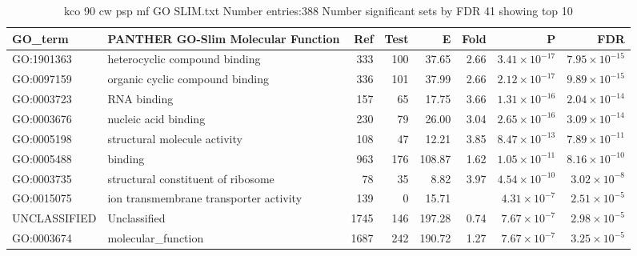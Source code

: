\begin{table}[ht]
\centering
\begin{tabular}{llrrrrrr}
  \hline
GO\_term & PANTHER GO-Slim Molecular Function & Ref & Test & E & Fold & P & FDR \\ 
  \hline
GO:1901363 & heterocyclic compound binding  & 333 & 100 & 37.65 & 2.66 & $3.41 \times 10^{-17}$ & $7.95 \times 10^{-15}$ \\ 
  GO:0097159 & organic cyclic compound binding  & 336 & 101 & 37.99 & 2.66 & $2.12 \times 10^{-17}$ & $9.89 \times 10^{-15}$ \\ 
  GO:0003723 & RNA binding  & 157 & 65 & 17.75 & 3.66 & $1.31 \times 10^{-16}$ & $2.04 \times 10^{-14}$ \\ 
  GO:0003676 & nucleic acid binding  & 230 & 79 & 26.00 & 3.04 & $2.65 \times 10^{-16}$ & $3.09 \times 10^{-14}$ \\ 
  GO:0005198 & structural molecule activity  & 108 & 47 & 12.21 & 3.85 & $8.47 \times 10^{-13}$ & $7.89 \times 10^{-11}$ \\ 
  GO:0005488 & binding  & 963 & 176 & 108.87 & 1.62 & $1.05 \times 10^{-11}$ & $8.16 \times 10^{-10}$ \\ 
  GO:0003735 & structural constituent of ribosome  & 78 & 35 & 8.82 & 3.97 & $4.54 \times 10^{-10}$ & $3.02 \times 10^{-8}$ \\ 
  GO:0015075 & ion transmembrane transporter activity  & 139 & 0 & 15.71 &  & $4.31 \times 10^{-7}$ & $2.51 \times 10^{-5}$ \\ 
  UNCLASSIFIED & Unclassified  & 1745 & 146 & 197.28 & 0.74 & $7.67 \times 10^{-7}$ & $2.98 \times 10^{-5}$ \\ 
  GO:0003674 & molecular\_function  & 1687 & 242 & 190.72 & 1.27 & $7.67 \times 10^{-7}$ & $3.25 \times 10^{-5}$ \\ 
  \hline
\end{tabular}
\caption{kco 90 cw psp mf GO SLIM.txt Number entries:388 Number significant sets by FDR 41 showing top 10} 
\label{tab:kco 90 cw psp mf GO SLIM.txt Number entries:388 Number significant sets by FDR 41 showing top 10}
\end{table}

